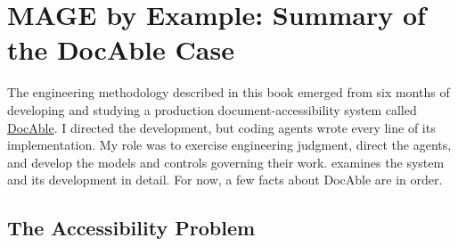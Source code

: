 



\chapter{MAGE by Example: Summary of the DocAble Case}


The engineering methodology described in this book emerged from six months of developing and studying a production document-accessibility system called \href{\%7B\%7Bproduct_url\%7D\%7D}{DocAble}. I directed the development, but coding agents wrote every line of its implementation. My role was to exercise engineering judgment, direct the agents, and develop the models and controls governing their work.  examines the system and its development in detail. For now, a few facts about DocAble are in order.

\section{The Accessibility Problem}\label{heading:the-accessibility-problem}



